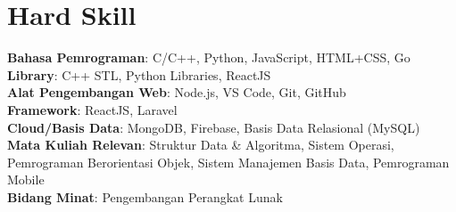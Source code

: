 \documentclass[a4paper,11pt]{article}
\begin{document}
\section{\textbf{Hard Skill}}
\begin{itemize}[leftmargin=0.05in, label={}]
  \small{\item{
        \textbf{Bahasa Pemrograman}{: C/C++, Python, JavaScript, HTML+CSS, Go } \\
        \textbf{Library}{: C++ STL, Python Libraries, ReactJS }\\
        \textbf{Alat Pengembangan Web}{: Node.js, VS Code, Git, GitHub } \\
        \textbf{Framework}{: ReactJS, Laravel} \\
        \textbf{Cloud/Basis Data}{: MongoDB, Firebase, Basis Data Relasional (MySQL) } \\

        \textbf{Mata Kuliah Relevan}{: Struktur Data \& Algoritma, Sistem Operasi, Pemrograman Berorientasi Objek, Sistem Manajemen Basis Data, Pemrograman Mobile } \\
        \textbf{Bidang Minat}{: Pengembangan Perangkat Lunak} \\
        }}
\end{itemize}
\vspace{-16pt}
\end{document}
